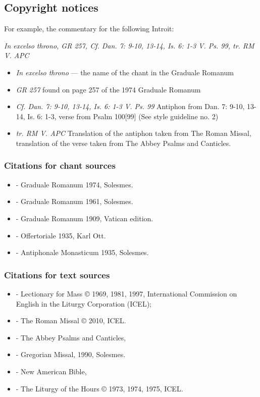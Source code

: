 \documentclass[10pt,parskip,paper=216mm:162mm]{graduale} %
\begin{document}
\subsection{Copyright notices}

For example, the commentary for the following Introit:
\begin{center}
\emph{In excelso throno, GR 257, Cf. Dan. 7: 9-10, 13-14, Is. 6: 1-3 V. Ps. 99, tr. RM V. APC}
\end{center}

\begin{itemize}
    \item\emph{In excelso throno} --- the name of the chant in the Graduale Romanum
    \item\emph{GR 257} found on page 257 of the 1974 Graduale Romanum
    \item\emph{Cf. Dan. 7: 9-10, 13-14, Is. 6: 1-3 V. Ps. 99} Antiphon from Dan. 7: 9-10, 13-14, Is. 6: 1-3, verse from Psalm 100[99] (See style guideline no. 2)
    \item\emph{tr. RM V. APC} Translation of the antiphon taken from The Roman Missal, translation of the verse taken from The Abbey Psalms and Canticles. %
\end{itemize}

\subsubsection{Citations for chant sources}
\begin{itemize}
    \item[GR] - Graduale Romanum 1974, Solesmes.
    \item[GR61] - Graduale Romanum 1961, Solesmes.
    \item[GR09] - Graduale Romanum 1909, Vatican edition.
    \item[OR] - Offertoriale 1935, Karl Ott.
    \item[AM] - Antiphonale Monasticum 1935, Solesmes.
\end{itemize}

\subsubsection{Citations for text sources}
\begin{itemize}
    \item[LFM] - Lectionary for Mass © 1969, 1981, 1997, International Commission on English in the Liturgy Corporation (ICEL);
    \item[RM] - The Roman Missal © 2010, ICEL. 
    \item[APC] - The Abbey Psalms and Canticles, 
    \item[GM] - Gregorian Missal, 1990, Solesmes.
    \item[NAB] - New American Bible,
    \item[LH] - The Liturgy of the Hours © 1973, 1974, 1975, ICEL.
\end{itemize}
\end{document}
